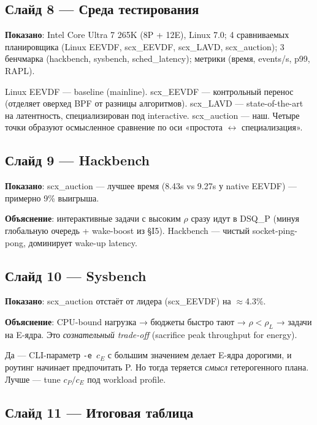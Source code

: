 \documentclass[11pt,a4paper]{article}
\begin{document}
\subsection*{Слайд 8 — Среда тестирования}

\textbf{Показано}: Intel Core Ultra 7 265K (8P + 12E), Linux 7.0;
4 сравниваемых планировщика (Linux EEVDF, scx\_EEVDF, scx\_LAVD,
scx\_auction); 3 бенчмарка (hackbench, sysbench, sched\_latency);
метрики (время, events/s, p99, RAPL).

\begin{ask}
Linux EEVDF — baseline (mainline). scx\_EEVDF — контрольный перенос
(отделяет оверхед BPF от разницы алгоритмов). scx\_LAVD —
state-of-the-art на латентность, специализирован под interactive.
scx\_auction — наш. Четыре точки образуют осмысленное сравнение по
оси «простота $\leftrightarrow$ специализация».
\end{ask}

\subsection*{Слайд 9 — Hackbench}

\textbf{Показано}: scx\_auction — лучшее время (8.43s vs 9.27s у
native EEVDF) — примерно 9\% выигрыша.

\textbf{Объяснение}: интерактивные задачи с высоким $\rho$ сразу
идут в DSQ\_P (минуя глобальную очередь + wake-boost из §I5).
Hackbench — чистый socket-ping-pong, доминирует wake-up latency.

\subsection*{Слайд 10 — Sysbench}

\textbf{Показано}: scx\_auction отстаёт от лидера (scx\_EEVDF)
на $\approx$4.3\%.

\textbf{Объяснение}: CPU-bound нагрузка → бюджеты быстро тают →
$\rho<\rho_L$ → задачи на E-ядра. Это \emph{сознательный trade-off}
(sacrifice peak throughput for energy).

\begin{ask}
Да — CLI-параметр \texttt{-e $c_E$} с большим значением делает
E-ядра дорогими, и роутинг начинает предпочитать P. Но тогда
теряется \emph{смысл} гетерогенного плана. Лучше — tune $c_P/c_E$
под workload profile.
\end{ask}

\subsection*{Слайд 11 — Итоговая таблица}
\end{document}
